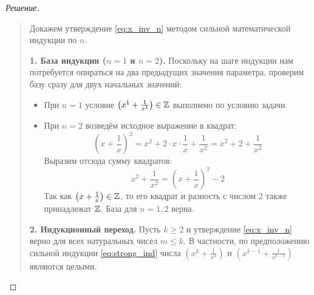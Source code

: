 \begin{proof}[Решение]~\\
    \begin{quote}
        Докажем утверждение \eqref{eq:x_inv_n} методом сильной 
        математической индукции по $n$.

        \textbf{1. База индукции ($n = 1$ и $n = 2$).} 
        Поскольку на шаге индукции нам потребуется опираться на два 
        предыдущих значения параметра, проверим базу сразу для двух 
        начальных значений:
        \begin{itemize}
            \item При $n = 1$ условие $\left(x^1 + \frac{1}{x^1}\right) \in \mathbb{Z}$ 
            выполнено по условию задачи.
            \item При $n = 2$ возведём исходное выражение в квадрат:
            \[
                \left(x + \frac{1}{x}\right)^2 = 
                x^2 + 2 \cdot x \cdot \frac{1}{x} + \frac{1}{x^2} = 
                x^2 + 2 + \frac{1}{x^2}
            \]
            Выразим отсюда сумму квадратов:
            \[
                x^2 + \frac{1}{x^2} = \left(x + \frac{1}{x}\right)^2 - 2
            \]
            Так как $\left(x + \frac{1}{x}\right) \in \mathbb{Z}$, то его квадрат 
            и разность с числом $2$ также принадлежат $\mathbb{Z}$. База для 
            $n = 1, 2$ верна.
        \end{itemize}

        \textbf{2. Индукционный переход.} Пусть $k \ge 2$ и утверждение 
        \eqref{eq:x_inv_n} верно для всех натуральных чисел $m \le k$. 
        В частности, по предположению сильной индукции \eqref{eq:strong_ind} 
        числа $\left(x^k + \frac{1}{x^k}\right)$ и 
        $\left(x^{k-1} + \frac{1}{x^{k-1}}\right)$ являются целыми.


\end{quote}
\end{proof}
